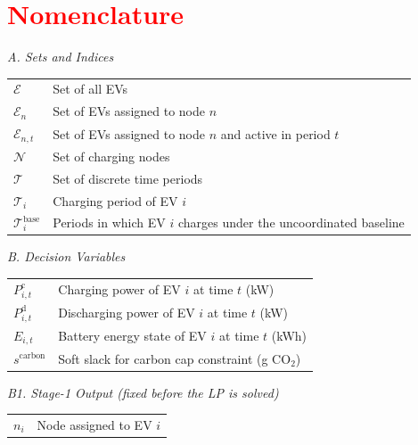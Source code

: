 \documentclass[sustainability,article,submit,moreauthors,pdftex]{Definitions/mdpi}
\begin{document}
\section*{\textcolor{red}{Nomenclature}}

\noindent\textit{A. Sets and Indices}\vspace{6pt}\\

\begin{tabular}{@{} p{2.2cm} p{10.3cm} }
$\mathcal{E}$ & Set of all EVs \\
$\mathcal{E}_n$ & Set of EVs assigned to node $n$ \\
$\mathcal{E}_{n,t}$ & Set of EVs assigned to node $n$ and active in period $t$ \\
$\mathcal{N}$ & Set of charging nodes \\
$\mathcal{T}$ & Set of discrete time periods \\
$\mathcal{T}_i$ & Charging period of EV $i$ \\
$\mathcal{T}^{\mathrm{base}}_i$ & Periods in which EV $i$ charges under the uncoordinated baseline \\
\end{tabular}\vspace{10pt}

\noindent\textit{B. Decision Variables}\vspace{6pt}\\

\begin{tabular}{@{} p{2.2cm} p{10.3cm} }
$P^{\mathrm{c}}_{i,t}$ & Charging power of EV $i$ at time $t$ (kW) \\
$P^{\mathrm{d}}_{i,t}$ & Discharging power of EV $i$ at time $t$ (kW) \\
$E_{i,t}$ & Battery energy state of EV $i$ at time $t$ (kWh) \\
$s^{\mathrm{carbon}}$ & Soft slack for carbon cap constraint (g CO$_2$) \\
\end{tabular}\vspace{10pt}

\noindent\textit{B1. Stage-1 Output (fixed before the LP is solved)}\vspace{4pt}\\

\begin{tabular}{@{} p{2.2cm} p{10.3cm} }
$n_i$ & Node assigned to EV $i$ \\
\end{tabular}\vspace{10pt}
\end{document}
